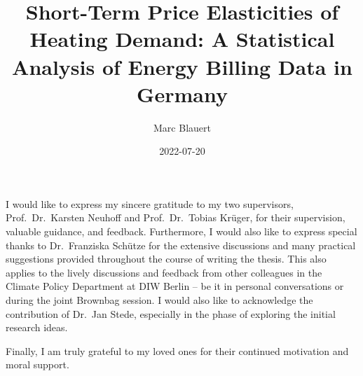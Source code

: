 \documentclass[12pt,twoside]{reedthesis}
\title{Short-Term Price Elasticities of Heating Demand: A Statistical Analysis of Energy Billing Data in Germany}
\author{Marc Blauert}
\date{2022-07-20}
\begin{document}
  \maketitle

\frontmatter %
\pagestyle{empty} %
  \begin{acknowledgements}
    I would like to express my sincere gratitude to my two supervisors, Prof.~Dr.~Karsten Neuhoff and Prof.~Dr.~Tobias Krüger, for their supervision, valuable guidance, and feedback. Furthermore, I would also like to express special thanks to Dr.~Franziska Schütze for the extensive discussions and many practical suggestions provided throughout the course of writing the thesis. This also applies to the lively discussions and feedback from other colleagues in the Climate Policy Department at DIW Berlin -- be it in personal conversations or during the joint Brownbag session. I would also like to acknowledge the contribution of Dr.~Jan Stede, especially in the phase of exploring the initial research ideas.

    \par
    \bigskip

    Finally, I am truly grateful to my loved ones for their continued motivation and moral support.
  \end{acknowledgements}

  \hypersetup{linkcolor=black}
  \setcounter{secnumdepth}{2}
  \setcounter{tocdepth}{2}
  \tableofcontents

  \listoftables
\end{document}
